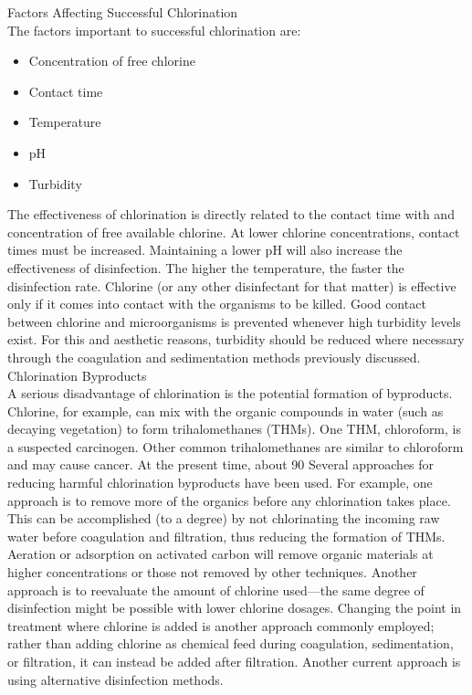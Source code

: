 Factors Affecting Successful Chlorination\\
The factors important to successful chlorination are:
\begin{itemize}
\item Concentration of free chlorine
\item Contact time
\item Temperature
\item pH
\item Turbidity
\end{itemize}
The effectiveness of chlorination is directly related to the contact time with and concentration of free available chlorine. At lower chlorine concentrations, contact times must be increased. Maintaining a lower pH will also increase the effectiveness of disinfection. The higher the temperature, the faster the disinfection rate. Chlorine (or any other disinfectant for that matter) is effective only if it comes into contact with the organisms to be killed. Good contact between chlorine and microorganisms is prevented whenever high turbidity levels exist. For this and aesthetic reasons, turbidity should be reduced where necessary through the coagulation and sedimentation methods previously discussed.\\
Chlorination Byproducts\\
A serious disadvantage of chlorination is the potential formation of byproducts. Chlorine, for example, can mix with the organic compounds in water (such as decaying vegetation) to form trihalomethanes (THMs). One THM, chloroform, is a suspected carcinogen. Other common trihalomethanes are similar to chloroform and may cause cancer.
At the present time, about 90%
Several approaches for reducing harmful chlorination byproducts have been used. For example, one approach is to remove more of the organics before any chlorination takes place. This can be accomplished (to a degree) by not chlorinating the incoming
raw water before coagulation and filtration, thus reducing the formation of THMs. Aeration or adsorption on activated carbon will remove organic materials at higher concentrations or those not removed by other techniques. Another approach is to reevaluate the amount of chlorine used—the same degree of disinfection might be possible with lower chlorine dosages. Changing the point in treatment where chlorine is added is another approach commonly employed; rather than adding chlorine as chemical feed during coagulation, sedimentation, or filtration, it can instead be added after filtration. Another current approach is using alternative disinfection methods.\\
